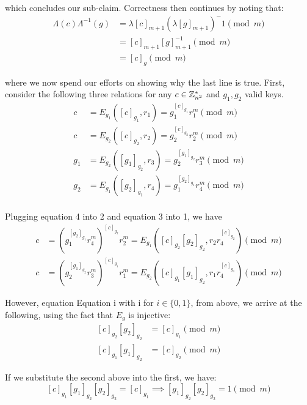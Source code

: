 \documentclass{article}
\begin{document}
\begin{enumerate}
\begin{itemize}
which concludes our sub-claim. Correctness then continues by noting that:%
\noindent\noindent\[%
\begin{aligned}
\Lambda(c)\Lambda^{-1}(g) &=  \lambda[c]_{m+1} (\lambda [g]_{m+1})^-1 \pmod m\\
&= [c]_{m+1}[g]_{m+1}^{-1}\pmod m \\
&= [c]_g \pmod m
\end{aligned}
\]%

where we now spend our efforts on showing why the last line is true. First, consider the following 
three relations for any $c \in \mathbb{Z}_{n^2}^*$ and $g_1,g_2$ valid keys.%
\noindent\noindent\[%
\begin{aligned}
  c &= E_{g_1}([c]_{g_1},r_1) = g_1^{[c]_{g_1}}r_1^m \pmod m \\
  c &= E_{g_2}([c]_{g_2},r_2) = g_2^{[c]_{g_2}}r_2^m \pmod m\\
  g_1 &= E_{g_2}([g_1]_{g_2},r_3) = g_2^{[g_1]_{g_2}}r_3^m \pmod m\\
  g_2 &= E_{g_1}([g_2]_{g_1},r_4) = g_1^{[g_2]_{g_1}}r_4^m \pmod m\\
\end{aligned}
\]%

Plugging equation 4 into 2 and equation 3 into 1, we have%
\noindent\noindent\[%
\begin{aligned}
  c &= (g_1^{[g_2]_{g_1}}r_4^m)^{[c]_{g_2}}r_2^m = E_{g_1}([c]_{g_2}[g_2]_{g_2}, r_2r_4^{[c]_{g_2}}) \pmod m\\
  c &= (g_2^{[g_1]_{g_2}}r_3^m)^{[c]_{g_1}}r_1^m = E_{g_2}([c]_{g_1}[g_1]_{g_2}, r_1r_4^{[c]_{g_1}}) \pmod  m
\end{aligned}
\]%

However, equation Equation i with i for $i\in \{0,1\}$, from above, we arrive at the following,
using the fact that $E_g$ is injective:%
\noindent\noindent\[%
\begin{aligned}
[c]_{g_2}[g_2]_{g_2} &= [c]_{g_1} \pmod m \\
[c]_{g_1}[g_1]_{g_2} &= [c]_{g_2} \pmod m
\end{aligned}
\]%

If we substitute the second above into the first, we have:%
\noindent\noindent\[%
[c]_{g_1}[g_1]_{g_2}[g_2]_{g_2} = [c]_{g_1} \implies [g_1]_{g_2}[g_2]_{g_2} = 1 \pmod m
\]%


\end{itemize}
\end{enumerate}
\end{document}
